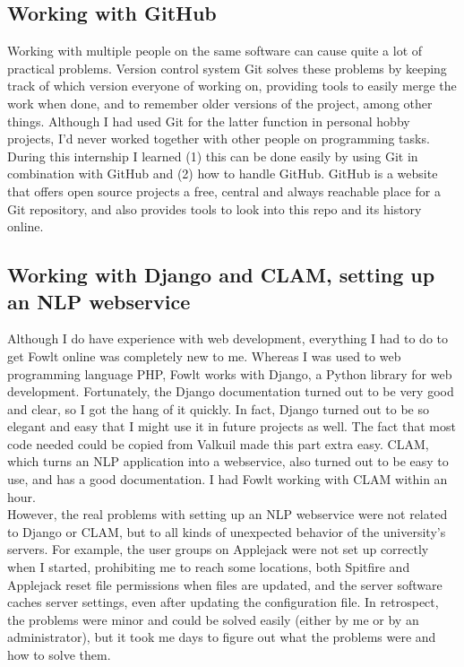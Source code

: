 \documentclass[12pt]{article}
\begin{document}
\subsection{Working with GitHub}
Working with multiple people on the same software can cause quite a lot of practical problems. Version control system Git solves these problems by keeping track of which version everyone of working on, providing tools to easily merge the work when done, and to remember older versions of the project, among other things. Although I had used Git for the latter function in personal hobby projects, I'd never worked together with other people on programming tasks. During this internship I learned (1) this can be done easily by using Git in combination with GitHub and (2) how to handle GitHub. GitHub is a website that offers open source projects a free, central and always reachable place for a Git repository, and also provides tools to look into this repo and its history online.

\subsection{Working with Django and CLAM, setting up an NLP webservice}
Although I do have experience with web development, everything I had to do to get Fowlt online was completely new to me. Whereas I was used to web programming language PHP, Fowlt works with Django, a Python library for web development. Fortunately, the Django documentation turned out to be very good and clear, so I got the hang of it quickly. In fact, Django turned out to be so elegant and easy that I might use it in future projects as well. The fact that most code needed could be copied from Valkuil made this part extra easy. CLAM, which turns an NLP application into a webservice, also turned out to be easy to use, and has a good documentation. I had Fowlt working with CLAM within an hour.
\\\indent
However, the real problems with setting up an NLP webservice were not related to Django or CLAM, but to all kinds of unexpected behavior of the university's servers. For example, the user groups on Applejack were not set up correctly when I started, prohibiting me to reach some locations, both Spitfire and Applejack reset file permissions when files are updated, and the server software caches server settings, even after updating the configuration file. In retrospect, the problems were minor and could be solved easily (either by me or by an administrator), but it took me days to figure out what the problems were and how to solve them.
\end{document}
